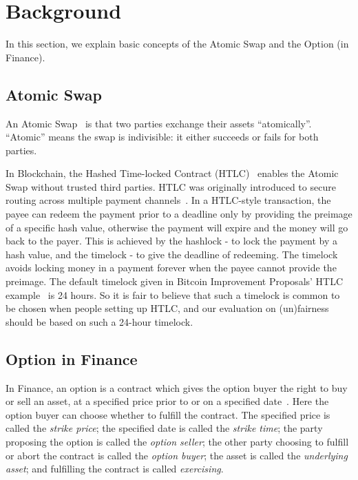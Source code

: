 \section{Background}
\label{sec:background}

In this section, we explain basic concepts of the Atomic Swap and the Option (in Finance).

\subsection{Atomic Swap}

An Atomic Swap~\cite{nolan2013alt} is that two parties exchange their assets ``atomically''.
``Atomic'' means the swap is indivisible: it either succeeds or fails for both parties.

In Blockchain, the Hashed Time-locked Contract (HTLC)~\cite{poon2016bitcoin} enables the Atomic Swap without trusted third parties.
HTLC was originally introduced to secure routing across multiple payment channels~\cite{paychannel2018btcwiki}.
In a HTLC-style transaction, the payee can redeem the payment prior to a deadline only by providing the preimage of a specific hash value, otherwise the payment will expire and the money will go back to the payer.
This is achieved by the hashlock - to lock the payment by a hash value, and the timelock - to give the deadline of redeeming.
The timelock avoids locking money in a payment forever when the payee cannot provide the preimage.
The default timelock given in Bitcoin Improvement Proposals' HTLC example~\cite{btcdrak2015checksequenceverify} is 24 hours. So it is fair to believe that such a timelock is common to be chosen when people setting up HTLC, and our evaluation on (un)fairness should be based on such a 24-hour timelock.

\subsection{Option in Finance}
\label{subsec:background_option}

In Finance, an option is a contract which gives the option buyer the right to buy or sell an asset, at a specified price prior to or on a specified date~\cite{higham2004introduction}.
Here the option buyer can choose whether to fulfill the contract.
The specified price is called the \textit{strike price};
the specified date is called the \textit{strike time};
the party proposing the option is called the \textit{option seller};
the other party choosing to fulfill or abort the contract is called the \textit{option buyer};
the asset is called the \textit{underlying asset};
and fulfilling the contract is called \textit{exercising}.

